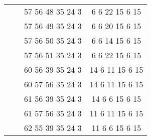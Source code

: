 \begin{tabular}[t]{|c|c|c|c|}
                        &                     & 57 56 48 35 24 3      & 6 6 22 15 6 15  \\ \cline{4-4}
                        &                     & 57 56 49 35 24 3      & 6 6 20 15 6 15  \\ \cline{4-4}
                        &                     & 57 56 50 35 24 3      & 6 6 14 15 6 15  \\ \cline{4-4}
                        &                     & 57 56 51 35 24 3      & 6 6 22 15 6 15  \\ \cline{4-4}
                        &                     & 60 56 39 35 24 3      & 14 6 11 15 6 15 \\ \cline{4-4}
                        &                     & 60 57 56 35 24 3      & 14 6 11 15 6 15 \\ \cline{4-4}
                        &                     & 61 56 39 35 24 3      & 14 6 6 15 6 15  \\ \cline{4-4}
                        &                     & 61 57 56 35 24 3      & 11 6 11 15 6 15 \\ \cline{4-4}
                        &                     & 62 55 39 35 24 3      & 11 6 6 15 6 15  \\ \hline
  \end{tabular}
\\
